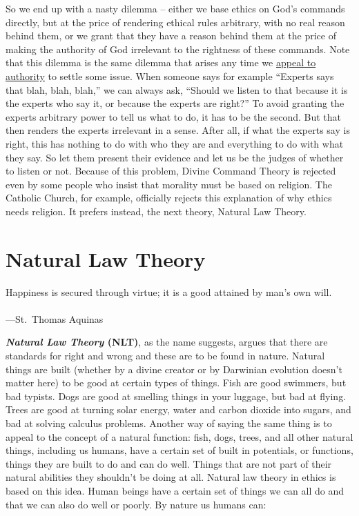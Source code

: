 \documentclass[12pt, openany]{book}
\newenvironment{epigraph}%
{
\begin{flushright}
\begin{minipage}{30em}
\begin{flushright}
\itshape
}%
{
\end{flushright}
\end{minipage}
\end{flushright}
\vspace{1em}
}
\begin{document}
So we end up with a nasty dilemma -- either we base ethics on God's commands directly, but at the price of rendering ethical rules arbitrary, with no real reason behind them, or we grant that they have a reason behind them at the price of making the authority of God irrelevant to the rightness of these commands. Note that this dilemma is the same dilemma that arises any time we \protect\hyperlink{appeal-to-authority}{appeal to authority} to settle some issue. When someone says for example ``Experts says that blah, blah, blah,'' we can always ask, ``Should we listen to that because it is the experts who say it, or because the experts are right?'' To avoid granting the experts arbitrary power to tell us what to do, it has to be the second. But that then renders the experts irrelevant in a sense. After all, if what the experts say is right, this has nothing to do with who they are and everything to do with what they say. So let them present their evidence and let us be the judges of whether to listen or not. Because of this problem, Divine Command Theory is rejected even by some people who insist that morality must be based on religion. The Catholic Church, for example, officially rejects this explanation of why ethics needs religion. It prefers instead, the next theory, Natural Law Theory.

\hypertarget{natural-law-theory}{%
\section{Natural Law Theory}\label{natural-law-theory}}

\begin{epigraph}

Happiness is secured through virtue; it is a good attained by man's own will.\\
~\\
---St.~Thomas Aquinas

\end{epigraph}

\textbf{\emph{Natural Law Theory} (NLT)}, as the name suggests, argues that there are standards for right and wrong and these are to be found in nature. Natural things are built (whether by a divine creator or by Darwinian evolution doesn't matter here) to be good at certain types of things. Fish are good swimmers, but bad typists. Dogs are good at smelling things in your luggage, but bad at flying. Trees are good at turning solar energy, water and carbon dioxide into sugars, and bad at solving calculus problems. Another way of saying the same thing is to appeal to the concept of a natural function: fish, dogs, trees, and all other natural things, including us humans, have a certain set of built in potentials, or functions, things they are built to do and can do well. Things that are not part of their natural abilities they shouldn't be doing at all. Natural law theory in ethics is based on this idea. Human beings have a certain set of things we can all do and that we can also do well or poorly. By nature us humans can:
\end{document}

